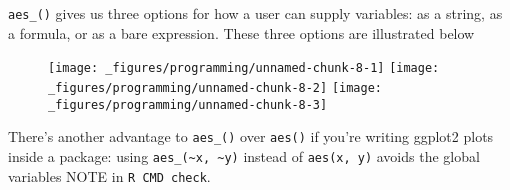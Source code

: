 \texttt{aes\_()} gives us three options for how a user can supply
variables: as a string, as a formula, or as a bare expression. These
three options are illustrated below

\begin{Shaded}
\begin{Highlighting}[]
\StringTok{ }
  \NormalTok{(~}\NormalTok{(}\NormalTok{), } 
\NormalTok{\}}
\NormalTok{) +}\StringTok{ }\NormalTok{(} \NormalTok{)}

\StringTok{ }
  \NormalTok{(~}\NormalTok{(}\NormalTok{), } 
\NormalTok{\}}
\StringTok{ }\NormalTok{(} \NormalTok{)}

\StringTok{ }
  \NormalTok{(~}\NormalTok{(}\NormalTok{), } 
\NormalTok{\}}
\StringTok{ }\NormalTok{(} \NormalTok{)}
\end{Highlighting}
\end{Shaded}

\begin{figure}[H]
  \texttt{[image: \_figures/programming/unnamed-chunk-8-1]}%
  \texttt{[image: \_figures/programming/unnamed-chunk-8-2]}%
  \texttt{[image: \_figures/programming/unnamed-chunk-8-3]}
\end{figure}

There's another advantage to \texttt{aes\_()} over \texttt{aes()} if
you're writing ggplot2 plots inside a package: using
\texttt{aes\_(\textasciitilde{}x, \textasciitilde{}y)} instead of
\texttt{aes(x, y)} avoids the global variables NOTE in
\texttt{R CMD check}. 

